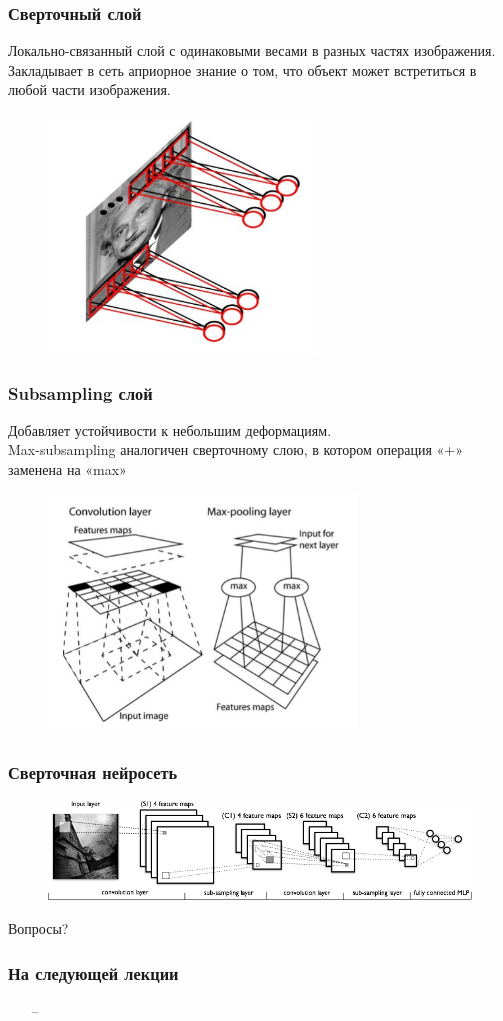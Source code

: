 \documentclass[10pt]{beamer}
\begin{document}
\begin{frame}\frametitle{Сверточный слой}
  Локально-связанный слой с одинаковыми весами в разных частях изображения.\\
  Закладывает в сеть априорное знание о том, что объект может встретиться в любой части изображения.
	\begin{figure}[htbp]
	  \includegraphics[height=180pt, keepaspectratio = true]{images/conv_layer}   
	\end{figure}
\end{frame}

\begin{frame}\frametitle{Subsampling слой}
	Добавляет устойчивости к небольшим деформациям.\\
	Max-subsampling аналогичен сверточному слою, в котором операция «+» заменена на «max»
	\begin{figure}[htbp]
	  \includegraphics[height=180pt, keepaspectratio = true]{images/subsampling}   
	\end{figure}
\end{frame}

\begin{frame}\frametitle{Сверточная нейросеть}
	\begin{figure}[htbp]
	  \includegraphics[height=75pt, keepaspectratio = true]{images/convnet}   
	\end{figure}
\end{frame}

\begin{frame}[standout]
  Вопросы?
\end{frame}

\appendix

\begin{frame}\frametitle{На следующей лекции}
	\begin{itemize}
    	\item[--] 
	\end{itemize}
\end{frame}
\end{document}
